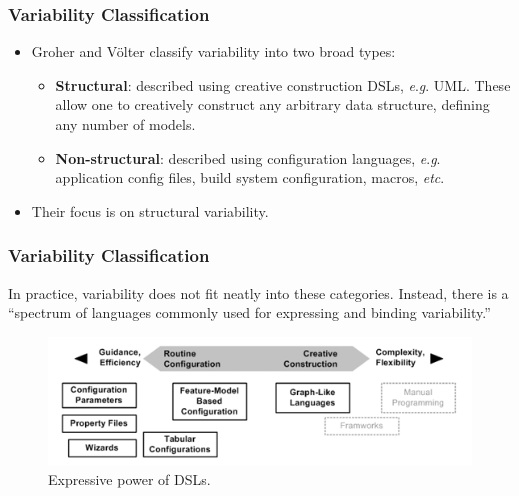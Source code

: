 \documentclass{beamer}
\newcommand{\eg}{\textit{e}.\textit{g}. }
\newcommand{\etc}{\textit{etc}. }
\begin{document}
\begin{frame}
\frametitle{Variability Classification}

\begin{itemize}

\item Groher and V{\"o}lter classify variability into two broad
  types\cite{groher2007expressing}:

\pause

\begin{itemize}
\item \textbf{Structural}: described using creative construction DSLs,
  \eg \ac{UML}. These allow one to creatively construct any arbitrary
  data structure, defining any number of models.

\pause

\item \textbf{Non-structural}: described using configuration
  languages, \eg application config files, build system configuration,
  macros, \etc

\pause

\end{itemize}

\item Their focus is on structural variability.

\end{itemize}

\end{frame}

\begin{frame}
\frametitle{Variability Classification}

In practice, variability does not fit neatly into these
categories. Instead, there is a ``spectrum of languages commonly used
for expressing and binding variability.''\cite{groher2007expressing}

\begin{figure}
  \centering
  \includegraphics[scale=0.6]{images/variability_spectrum_voelter.png}
  \caption{Expressive power of \ac{DSL}s.\cite{groher2007expressing}}
\end{figure}

\end{frame}
\end{document}
